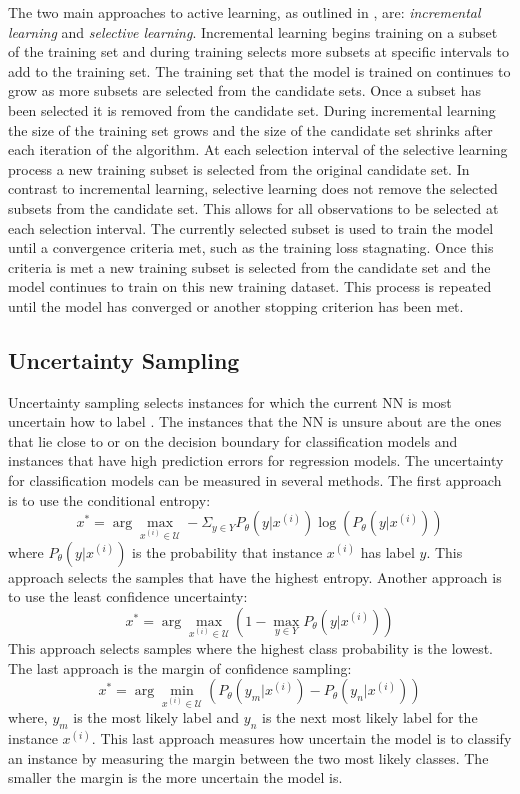 \documentclass[conference]{IEEEtran}
\begin{document}
	The two main approaches to active learning, as outlined in \cite{engelbrecht2001}, are: \textit{incremental learning} and \textit{selective learning}. Incremental learning begins training on a subset of the training set and during training selects more subsets at specific intervals to add to the training set. The training set that the model is trained on continues to grow as more subsets are selected from the candidate sets. Once a subset has been selected it is removed from the candidate set. During incremental learning the size of the training set grows and the size of the candidate set shrinks after each iteration of the algorithm. At each selection interval of the selective learning process a new training subset is selected from the original candidate set. In contrast to incremental learning, selective learning does not remove the selected subsets from the candidate set. This allows for all observations to be selected at each selection interval. The currently selected subset is used to train the model until a convergence criteria met, such as the training loss stagnating. Once this criteria is met a new training subset is selected from the candidate set and the model continues to train on this new training dataset. This process is repeated until the model has converged or another stopping criterion has been met.
	
	\subsection{Uncertainty Sampling}
	Uncertainty sampling selects instances for which the current NN is most uncertain how to label \cite{lewis1994sequential}. The instances that the NN is unsure about are the ones that lie close to or on the decision boundary for classification models and instances that have high prediction errors for regression models. The uncertainty for classification models can be measured in several methods. The first approach is to use the conditional entropy:
	$$
	x^*=\arg \max_{x^{(i)} \in \mathcal{U}} -\Sigma_{y\in Y}P_\theta(y \lvert x^{(i)})\log(P_\theta(y \lvert x^{(i)}))
	$$
	where $P_\theta(y \lvert x^{(i)})$ is the probability that instance $x^{(i)}$ has label $y$. This approach selects the samples that have the highest entropy. 
	Another approach is to use the least confidence uncertainty:
	$$
	x^*=\arg \max_{x^{(i)} \in \mathcal{U}} (1-\max_{y\in Y}P_\theta(y \lvert x^{(i)}))
	$$
	This approach selects samples where the highest class probability is the lowest.
	The last approach is the margin of confidence sampling:
	$$
	x^*=\arg \min_{x^{(i)} \in \mathcal{U}} (P_\theta(y_m \lvert x^{(i)}) - P_\theta(y_n \lvert x^{(i)}))
	$$
	where, $y_m$ is the most likely label and $y_n$ is the next most likely label for the instance $x^{(i)}$. This last approach measures how uncertain the model is to classify an instance by measuring the margin between the two most likely classes. The smaller the margin is the more uncertain the model is.
	
\end{document}
